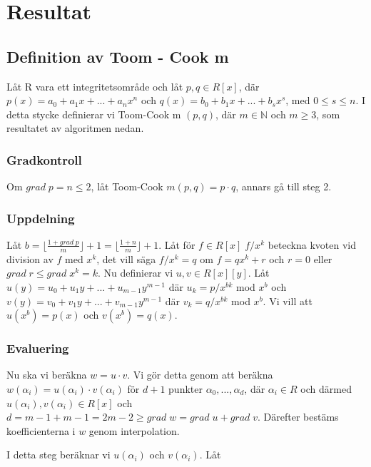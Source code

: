 \section{Resultat}
\subsection{Definition av Toom - Cook m}
Låt R vara ett integritetsområde och låt $p, q \in R[x]$, där $p(x)= a_0 + a_1 x + ... + a_n x^n$ och
$q(x) = b_0 + b_1 x + ... + b_s x^s$, med $0 \leq s \leq n$. I detta stycke definierar vi Toom-Cook m $(p, q)$, där
$m \in \mathbb{N}$ och $m \geq 3$, som resultatet av algoritmen nedan.

\subsubsection{Gradkontroll}
Om $grad \; p = n \leq 2$, låt Toom-Cook $m (p, q) = p \cdot q$, annars gå till steg 2.

\subsubsection{Uppdelning}
Låt $b=\displaystyle \lfloor \frac{1 + grad \; p}{m}\rfloor + 1 = \lfloor \frac{1 + n}{m}\rfloor + 1$.
Låt för $f \in R[x] \; f / x^k$ beteckna kvoten vid division av $f$ med $x^k$, det vill säga $f/x^k = q$ om $f = q x^k + r$
och $r = 0$ eller $grad \;r \leq grad \; x^k = k$.
Nu definierar vi $u, v \in R[x][y]$. Låt $u(y)=u_0 + u_1 y + ... + u_{m-1} y^{m-1}$ där $u_k = p / x^{bk}$ mod $x^b$ och
 $v(y)=v_0 + v_1 y + ... + v_{m-1} y^{m-1}$ där $v_k = q / x^{bk}$ mod $x^b$. Vi vill att $u(x^b)=p(x)$ och $v(x^b)=q(x)$.

\subsubsection{Evaluering}
Nu ska vi beräkna $w = u \cdot v$. Vi gör detta genom att beräkna $w(\alpha_i)=u(\alpha_i) \cdot v(\alpha_i)$
för $d + 1$ punkter $\alpha_0, ...,  \alpha_d$, där $\alpha_i \in R$ och därmed $u(\alpha_i), v(\alpha_i) \in R[x]$
och $d = m - 1 + m -1 = 2m-2 \geq grad \; w = grad \; u + grad \; v$. Därefter bestäms koefficienterna i $w$ genom interpolation.

I detta steg beräknar vi $u(\alpha_i)$ och $v(\alpha_i)$. Låt

